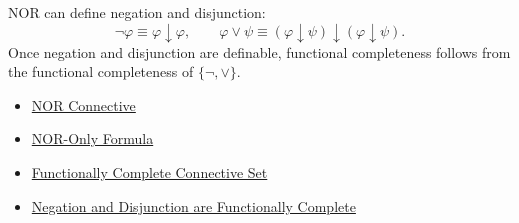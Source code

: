 \begin{remark*}[Interpretation]
NOR can define negation and disjunction:
\[
\neg\varphi\equiv\varphi\downarrow\varphi,
\qquad
\varphi\lor\psi\equiv(\varphi\downarrow\psi)\downarrow(\varphi\downarrow\psi).
\]
Once negation and disjunction are definable, functional completeness follows
from the functional completeness of \(\{\neg,\lor\}\).
\end{remark*}

\begin{dependencies}
\begin{itemize}
  \item \hyperref[def:nor-connective-propositional-logic]{NOR Connective}
  \item \hyperref[def:nor-only-formula-propositional-logic]{NOR-Only Formula}
  \item \hyperref[def:functionally-complete-connective-set-propositional-logic]{Functionally Complete Connective Set}
  \item \hyperref[thm:negation-disjunction-functionally-complete-propositional-logic]{Negation and Disjunction are Functionally Complete}
\end{itemize}
\end{dependencies}
